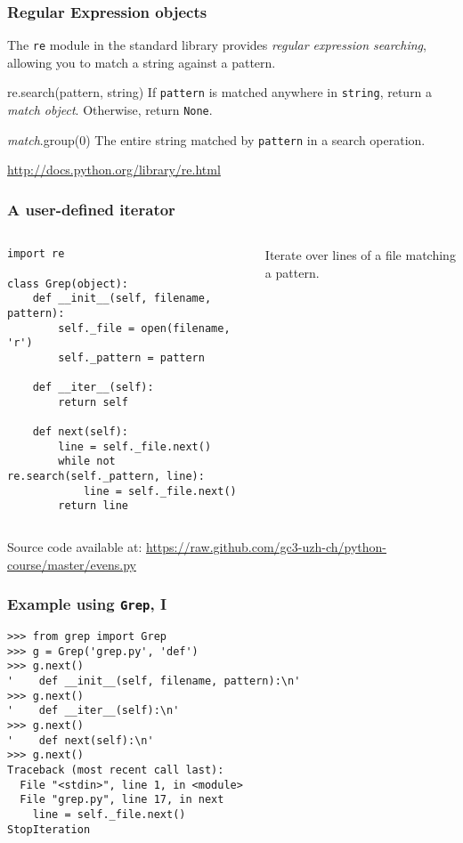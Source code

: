 \documentclass[english,serif,mathserif,xcolor=pdftex,dvipsnames,table]{beamer}
\begin{document}
\begin{frame}
  \frametitle{Regular Expression objects}
  The \texttt{re} module in the standard library provides
  \emph{regular expression searching}, allowing you to match a string
  against a pattern.

  \+
  \begin{describe}{re.search(pattern, string)}
    If \texttt{pattern} is matched anywhere in \texttt{string}, return
    a \emph{match object}.  Otherwise, return \texttt{None}.
  \end{describe}

  \+
  \begin{describe}{\emph{match}.group(0)}
    The entire string matched by \texttt{pattern} in a search operation.
  \end{describe}

  \+
  \begin{references}
    \url{http://docs.python.org/library/re.html}
  \end{references}
\end{frame}


\begin{frame}[fragile]
  \frametitle{A user-defined iterator}
  \begin{columns}[t]
    \begin{column}{0.5\textwidth}
\begin{lstlisting}[basicstyle=\ttfamily\footnotesize]
import re

class Grep(object):
    def __init__(self, filename, pattern):
        self._file = open(filename, 'r')
        self._pattern = pattern

    def __iter__(self):
        return self

    def next(self):
        line = self._file.next()
        while not re.search(self._pattern, line):
            line = self._file.next()
        return line
\end{lstlisting}
    \end{column}
    \begin{column}{0.5\textwidth}
      \raggedleft
      Iterate over lines of a file matching a pattern.
    \end{column}
  \end{columns}

  \+
  {\scriptsize Source code available at:
    \url{https://raw.github.com/gc3-uzh-ch/python-course/master/evens.py}}
\end{frame}


\begin{frame}[fragile]
  \frametitle{Example using \texttt{Grep}, I}
\begin{lstlisting}[showstringspaces=false]
>>> from grep import Grep
>>> g = Grep('grep.py', 'def')
>>> g.next()
'    def __init__(self, filename, pattern):\n'
>>> g.next()
'    def __iter__(self):\n'
>>> g.next()
'    def next(self):\n'
>>> g.next()
Traceback (most recent call last):
  File "<stdin>", line 1, in <module>
  File "grep.py", line 17, in next
    line = self._file.next()
StopIteration
\end{lstlisting}
\end{frame}
\end{document}
